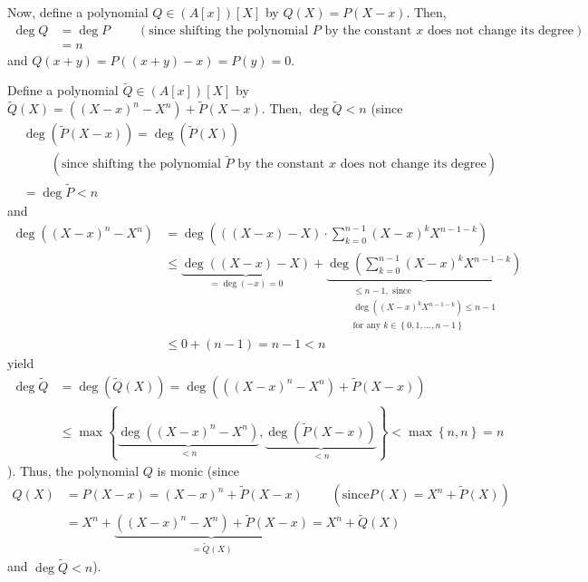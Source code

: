\documentclass[12pt,final,notitlepage,onecolumn]{article}%
\begin{document}
Now, define a polynomial $Q\in\left(  A\left[  x\right]  \right)  \left[
X\right]  $ by $Q\left(  X\right)  =P\left(  X-x\right)  $. Then,%
\begin{align*}
\deg Q  &  =\deg P\ \ \ \ \ \ \ \ \ \ \left(  \text{since shifting the
polynomial }P\text{ by the constant }x\text{ does not change its
degree}\right) \\
&  =n
\end{align*}
and $Q\left(  x+y\right)  =P\left(  \left(  x+y\right)  -x\right)  =P\left(
y\right)  =0$.

Define a polynomial $\widetilde{Q}\in\left(  A\left[  x\right]  \right)
\left[  X\right]  $ by $\widetilde{Q}\left(  X\right)  =\left(  \left(
X-x\right)  ^{n}-X^{n}\right)  +\widetilde{P}\left(  X-x\right)  $. Then,
$\deg\widetilde{Q}<n$ (since%
\begin{align*}
&  \deg\left(  \widetilde{P}\left(  X-x\right)  \right)  =\deg\left(
\widetilde{P}\left(  X\right)  \right) \\
&  \ \ \ \ \ \ \ \ \ \ \left(  \text{since shifting the polynomial }%
\widetilde{P}\text{ by the constant }x\text{ does not change its
degree}\right) \\
&  =\deg\widetilde{P}<n
\end{align*}
and%
\begin{align*}
\deg\left(  \left(  X-x\right)  ^{n}-X^{n}\right)   &  =\deg\left(  \left(
\left(  X-x\right)  -X\right)  \cdot\sum\limits_{k=0}^{n-1}\left(  X-x\right)
^{k}X^{n-1-k}\right) \\
&  \leq\underbrace{\deg\left(  \left(  X-x\right)  -X\right)  }_{=\deg\left(
-x\right)  =0}+\underbrace{\deg\left(  \sum\limits_{k=0}^{n-1}\left(
X-x\right)  ^{k}X^{n-1-k}\right)  }_{\substack{\leq n-1,\text{ since}%
\\\deg\left(  \left(  X-x\right)  ^{k}X^{n-1-k}\right)  \leq n-1\\\text{for
any }k\in\left\{  0,1,...,n-1\right\}  }}\\
&  \leq0+\left(  n-1\right)  =n-1<n
\end{align*}
yield%
\begin{align*}
\deg\widetilde{Q}  &  =\deg\left(  \widetilde{Q}\left(  X\right)  \right)
=\deg\left(  \left(  \left(  X-x\right)  ^{n}-X^{n}\right)  +\widetilde
{P}\left(  X-x\right)  \right) \\
&  \leq\max\left\{  \underbrace{\deg\left(  \left(  X-x\right)  ^{n}%
-X^{n}\right)  }_{<n},\underbrace{\deg\left(  \widetilde{P}\left(  X-x\right)
\right)  }_{<n}\right\}  <\max\left\{  n,n\right\}  =n
\end{align*}
). Thus, the polynomial $Q$ is monic (since%
\begin{align*}
Q\left(  X\right)   &  =P\left(  X-x\right)  =\left(  X-x\right)
^{n}+\widetilde{P}\left(  X-x\right)  \ \ \ \ \ \ \ \ \ \ \left(  \text{since
}P\left(  X\right)  =X^{n}+\widetilde{P}\left(  X\right)  \right) \\
&  =X^{n}+\underbrace{\left(  \left(  X-x\right)  ^{n}-X^{n}\right)
+\widetilde{P}\left(  X-x\right)  }_{=\widetilde{Q}\left(  X\right)  }%
=X^{n}+\widetilde{Q}\left(  X\right)
\end{align*}
and $\deg\widetilde{Q}<n$).
\end{document}
